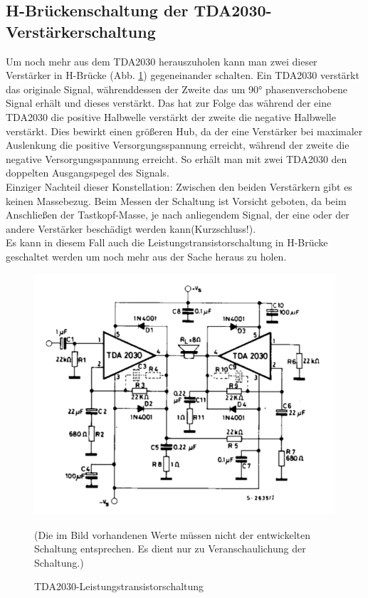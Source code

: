 \subsection{H-Brückenschaltung der TDA2030-Verstärkerschaltung}\label{subsec3.2.4}
Um noch mehr aus dem TDA2030 herauszuholen kann man zwei dieser Verstärker in H-Brücke (Abb. \ref{fig:3.2.4.1}) gegeneinander schalten. Ein TDA2030 verstärkt das originale Signal, währenddessen der Zweite das um 90° phasenverschobene Signal erhält und dieses verstärkt. Das hat zur Folge das während der eine TDA2030 die positive Halbwelle verstärkt der zweite die negative Halbwelle verstärkt. Dies bewirkt einen größeren Hub, da der eine Verstärker bei maximaler Auslenkung die positive Versorgungsspannung erreicht, während der zweite die negative Versorgungsspannung erreicht. So erhält man mit zwei TDA2030 den doppelten Ausgangspegel des Signals.\\
Einziger Nachteil dieser Konstellation: Zwischen den beiden Verstärkern gibt es keinen Massebezug. Beim Messen der Schaltung ist Vorsicht geboten, da beim Anschließen der Tastkopf-Masse, je nach anliegendem Signal, der eine oder der andere Verstärker beschädigt werden kann(Kurzschluss!).\\
Es kann in diesem Fall auch die Leistungstransistorschaltung in H-Brücke geschaltet werden um noch mehr aus der Sache heraus zu holen.
\begin{figure} [H]
	\centering
	\includegraphics[width=1\textwidth]{img/Grundlagen/TDA2030/TDA2030-H-Bruecke.PNG}
	\caption[TDA2030-Leistungstransistorschaltung]{TDA2030-Leistungstransistorschaltung\footnotemark}
	\text (Die im Bild vorhandenen Werte müssen nicht der entwickelten Schaltung entsprechen. Es dient nur zu Veranschaulichung der Schaltung.)
	\label {fig:3.2.4.1}
\end{figure}

